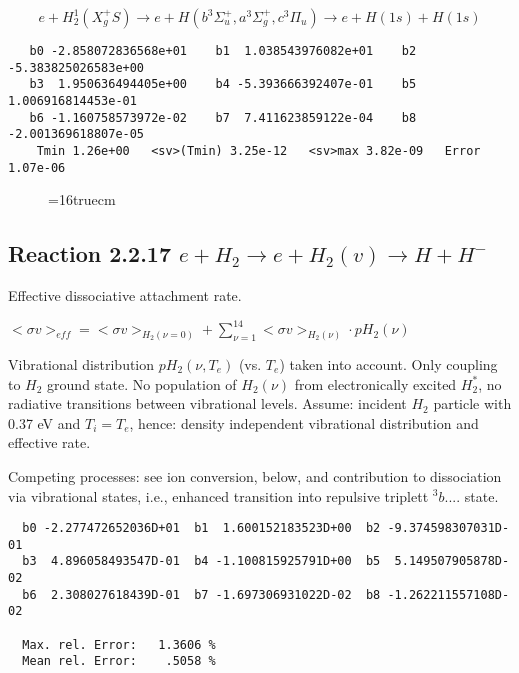\documentclass[12pt]{article}
\begin{document}
\begin{displaymath}
 e + H_2^1 (X_g^+ S ) \rightarrow e + H (b^3\Sigma^+_u , a^3\Sigma^+_g,
c^3\Pi_u)
             \rightarrow e + H(1s) + H(1s)
\end{displaymath}



\begin{small}\begin{verbatim}
   b0 -2.858072836568e+01    b1  1.038543976082e+01    b2 -5.383825026583e+00
   b3  1.950636494405e+00    b4 -5.393666392407e-01    b5  1.006916814453e-01
   b6 -1.160758573972e-02    b7  7.411623859122e-04    b8 -2.001369618807e-05
    Tmin 1.26e+00   <sv>(Tmin) 3.25e-12   <sv>max 3.82e-09   Error 1.07e-06
\end{verbatim}\end{small}
\begin{figure} \label{2.2.5.or}
\epsfxsize=16truecm
\end{figure}

 \newpage

\subsection{
Reaction 2.2.17  $e + H_2 \rightarrow e + H_2(v) \rightarrow H + H^-$
}
Effective dissociative attachment rate.

$ <\sigma v>_{eff} = <\sigma v>_{H_2(\nu=0)} + \sum_{\nu=1}^{14}
<\sigma v>_{H_2(\nu)} \cdot pH_2(\nu) $

Vibrational distribution $pH_2(\nu,T_e)$ (vs. $T_e$) taken into
account. Only coupling
to $H_2$ ground state. No population of $H_2(\nu)$ from electronically
excited $H_2^*$, no radiative transitions between vibrational levels.
Assume: incident $H_2$ particle with 0.37 eV and $T_i = T_e$,
hence: density independent vibrational distribution and effective
rate.

Competing processes: see ion conversion, below, and contribution to
dissociation via vibrational states, i.e., enhanced transition into
repulsive triplett $^3b....$ state.

\begin{small}\begin{verbatim}
  b0 -2.277472652036D+01  b1  1.600152183523D+00  b2 -9.374598307031D-01
  b3  4.896058493547D-01  b4 -1.100815925791D+00  b5  5.149507905878D-02
  b6  2.308027618439D-01  b7 -1.697306931022D-02  b8 -1.262211557108D-02

  Max. rel. Error:   1.3606 %
  Mean rel. Error:    .5058 %

\end{verbatim}\end{small}
\end{document}
